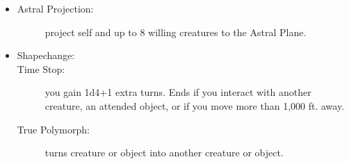 \documentclass[DIV=14, paper=a4, fontsize=12pt, twocolumn, twoside]{scrartcl}
\begin{document}
\begin{itemize}[align=parleft,labelwidth=1cm]
\begin{description}
\end{description}
\renewcommand{\labelitemi}{Necro}\item
\begin{description}
 \item[Astral Projection:] project self and up to 8 willing creatures to the Astral Plane.
\end{description}
\renewcommand{\labelitemi}{Trans}\item
\begin{description} 
 \item[Shapechange:] 
 \item[Time Stop:] you gain 1d4+1 extra turns. Ends if you interact with another creature, an attended object, or if you move more than 1,000 ft. away.
 \item[True Polymorph:] turns creature or object into another creature or object.
\end{description}
\end{itemize}
\end{document}

